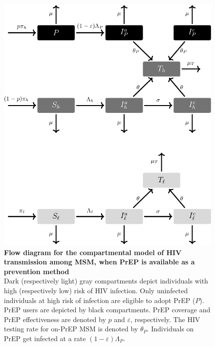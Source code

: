 \documentclass[12pt]{article}
\begin{document}
\newpage
\begin{figure}[H]
	\centering
	\includegraphics[width=12 cm]{Figures/Fig_S2}
	\caption[Flow diagram for the compartmental model of HIV transmission among MSM, when PrEP is available as a prevention method]{%
		{\bf Flow diagram for the compartmental model of HIV transmission among MSM, when PrEP is available as a prevention method}\\
	Dark (respectively light) gray compartments depict individuals with high (respectively low) risk of HIV infection. Only uninfected individuals at high risk of infection are eligible to adopt PrEP ($P$). PrEP users are depicted by black compartments. PrEP coverage and PrEP effectiveness are denoted by $p$ and $\varepsilon$, respectively. The HIV testing rate for on-PrEP MSM is denoted by $\theta_P$. Individuals on PrEP get infected at a rate $(1-\varepsilon) \Lambda_P$.}
	\label{fig:FlowDiagP}
\end{figure}
 
\end{document}
